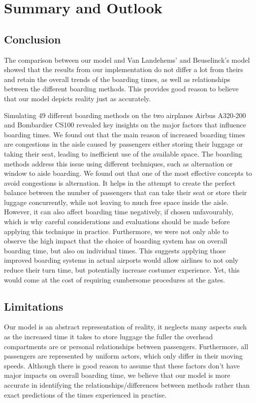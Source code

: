 \documentclass[11pt]{article}
\begin{document}
	

\section{Summary and Outlook}

\subsection{Conclusion}
The comparison between our model and Van Landehems' and Beuselinck's model \cite{beus} showed that the results from our implementation do not differ a lot from theirs and retain the overall trends of the boarding times, as well as relationships between the different boarding methods. This provides good reason to believe that our model depicts reality just as accurately. 

Simulating 49 different boarding methods on the two airplanes Airbus A320-200 and Bombardier CS100 revealed key insights on the major factors that influence boarding times. We found out that the main reason of increased boarding times are congestions in the aisle caused by passengers either storing their luggage or taking their seat, leading to inefficient use of the available space. The boarding methods address this issue using different techniques, such as alternation or window to aisle boarding. We found out that one of the most effective concepts to avoid congestions is alternation. It helps in the attempt to create the perfect balance between the number of passengers that can take their seat or store their luggage concurrently, while not leaving to much free space inside the aisle. However, it can also affect boarding time negatively, if chosen unfavourably, which is why careful considerations and evaluations should be made before applying this technique in practice. Furthermore, we were not only able to observe the high impact that the choice of boarding system has on overall boarding time, but also on individual times. This suggests applying those improved boarding systems in actual airports would allow airlines to not only reduce their turn time, but potentially increase costumer experience. Yet, this would come at the cost of requiring cumbersome procedures at the gates. 

\subsection{Limitations}
Our model is an abstract representation of reality, it neglects many aspects such as the increased time it takes to store luggage the fuller the overhead compartments are or personal relationships between passengers. Furthermore, all passengers are represented by uniform actors, which only differ in their moving speeds. Although there is good reason to assume that these factors don't have major impacts on overall boarding time, we believe that our model is more accurate in identifying the relationships/differences between methods rather than exact predictions of the times experienced in practise.
\end{document}
